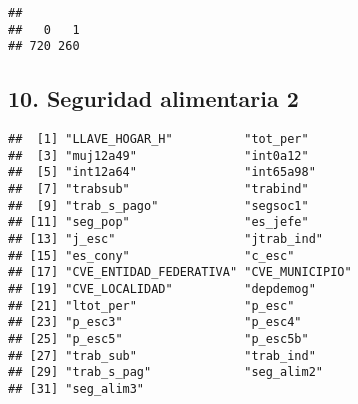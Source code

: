 \documentclass[11pt,]{article}
\newenvironment{Shaded}{\begin{snugshade}}{\end{snugshade}}
\newcommand{\KeywordTok}[1]{\textcolor[rgb]{0.13,0.29,0.53}{\textbf{#1}}}
\newcommand{\DataTypeTok}[1]{\textcolor[rgb]{0.13,0.29,0.53}{#1}}
\newcommand{\DecValTok}[1]{\textcolor[rgb]{0.00,0.00,0.81}{#1}}
\newcommand{\StringTok}[1]{\textcolor[rgb]{0.31,0.60,0.02}{#1}}
\newcommand{\CommentTok}[1]{\textcolor[rgb]{0.56,0.35,0.01}{\textit{#1}}}
\newcommand{\OtherTok}[1]{\textcolor[rgb]{0.56,0.35,0.01}{#1}}
\newcommand{\OperatorTok}[1]{\textcolor[rgb]{0.81,0.36,0.00}{\textbf{#1}}}
\newcommand{\NormalTok}[1]{#1}
\begin{document}
\begin{Shaded}
\end{Shaded}

\begin{verbatim}
## 
##   0   1 
## 720 260
\end{verbatim}

\subsection{10. Seguridad alimentaria 2}\label{seguridad-alimentaria-2}

\begin{Shaded}
\end{Shaded}

\begin{verbatim}
##  [1] "LLAVE_HOGAR_H"          "tot_per"               
##  [3] "muj12a49"               "int0a12"               
##  [5] "int12a64"               "int65a98"              
##  [7] "trabsub"                "trabind"               
##  [9] "trab_s_pago"            "segsoc1"               
## [11] "seg_pop"                "es_jefe"               
## [13] "j_esc"                  "jtrab_ind"             
## [15] "es_cony"                "c_esc"                 
## [17] "CVE_ENTIDAD_FEDERATIVA" "CVE_MUNICIPIO"         
## [19] "CVE_LOCALIDAD"          "depdemog"              
## [21] "ltot_per"               "p_esc"                 
## [23] "p_esc3"                 "p_esc4"                
## [25] "p_esc5"                 "p_esc5b"               
## [27] "trab_sub"               "trab_ind"              
## [29] "trab_s_pag"             "seg_alim2"             
## [31] "seg_alim3"
\end{verbatim}
\end{document}

